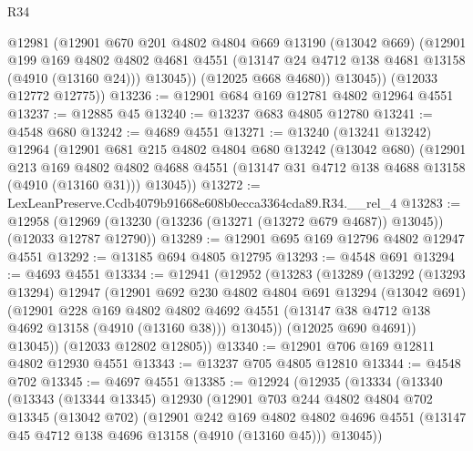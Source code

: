 \begin{lexlean}{R34}
\begin{coremodule}
            @12981
            (@12901
              @670
              @201
              @4802
              @4804
              @669
              @13190
              (@13042 @669)
              (@12901
                @199
                @169
                @4802
                @4802
                @4681
                @4551
                (@13147 @24 @4712 @138 @4681 @13158 (@4910 (@13160 @24)))
                @13045))
            (@12025 @668 @4680))
          @13045))
      (@12033 @12772 @12775))
@13236 := @12901 @684 @169 @12781 @4802 @12964 @4551
@13237 := @12885 @45
@13240 := @13237 @683 @4805 @12780
@13241 := @4548 @680
@13242 := @4689 @4551
@13271 := @13240
    (@13241 @13242)
    @12964
    (@12901
      @681
      @215
      @4802
      @4804
      @680
      @13242
      (@13042 @680)
      (@12901
        @213
        @169
        @4802
        @4802
        @4688
        @4551
        (@13147 @31 @4712 @138 @4688 @13158 (@4910 (@13160 @31)))
        @13045))
@13272 := LexLeanPreserve.Ccdb4079b91668e608b0ecca3364cda89.R34.__rel_4
@13283 := @12958
    (@12969 (@13230 (@13236 (@13271 (@13272 @679 @4687)) @13045)) (@12033 @12787 @12790))
@13289 := @12901 @695 @169 @12796 @4802 @12947 @4551
@13292 := @13185 @694 @4805 @12795
@13293 := @4548 @691
@13294 := @4693 @4551
@13334 := @12941
    (@12952
      (@13283
        (@13289
          (@13292
            (@13293 @13294)
            @12947
            (@12901
              @692
              @230
              @4802
              @4804
              @691
              @13294
              (@13042 @691)
              (@12901
                @228
                @169
                @4802
                @4802
                @4692
                @4551
                (@13147 @38 @4712 @138 @4692 @13158 (@4910 (@13160 @38)))
                @13045))
            (@12025 @690 @4691))
          @13045))
      (@12033 @12802 @12805))
@13340 := @12901 @706 @169 @12811 @4802 @12930 @4551
@13343 := @13237 @705 @4805 @12810
@13344 := @4548 @702
@13345 := @4697 @4551
@13385 := @12924
    (@12935
      (@13334
        (@13340
          (@13343
            (@13344 @13345)
            @12930
            (@12901
              @703
              @244
              @4802
              @4804
              @702
              @13345
              (@13042 @702)
              (@12901
                @242
                @169
                @4802
                @4802
                @4696
                @4551
                (@13147 @45 @4712 @138 @4696 @13158 (@4910 (@13160 @45)))
                @13045))

\end{coremodule}
\end{lexlean}

